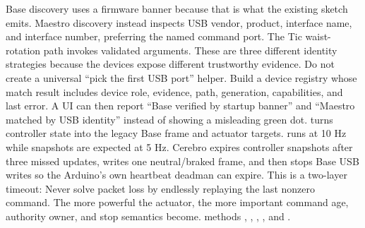 {}
\markdownRendererSectionEnd 
\markdownRendererSectionEnd \markdownRendererSectionBegin
{}\markdownRendererInterblockSeparator
{}Base discovery uses a firmware banner because that is what the existing sketch emits. Maestro discovery instead inspects USB vendor, product, interface name, and interface number, preferring the named command port. The Tic waist-rotation path invokes validated  arguments. These are three different identity strategies because the devices expose different trustworthy evidence.\markdownRendererParagraphSeparator
{}Do not create a universal “pick the first USB port” helper. Build a device registry whose match result includes device role, evidence, path, generation, capabilities, and last error. A UI can then report “Base verified by startup banner” and “Maestro matched by USB identity” instead of showing a misleading green dot.\markdownRendererInterblockSeparator
{}
\markdownRendererSectionEnd \markdownRendererSectionBegin
{}\markdownRendererInterblockSeparator
{} turns controller state into the legacy Base frame and actuator targets.  runs at 10 Hz while snapshots are expected at 5 Hz. Cerebro expires controller snapshots after three missed updates, writes one neutral/braked frame, and then stops Base USB writes so the Arduino's own heartbeat deadman can expire.\markdownRendererParagraphSeparator
{}This is a two-layer timeout:\markdownRendererInterblockSeparator
{}\markdownRendererInterblockSeparator
{}Never solve packet loss by endlessly replaying the last nonzero command. The more powerful the actuator, the more important command age, authority owner, and stop semantics become.\markdownRendererInterblockSeparator
{}
\markdownRendererSectionEnd \markdownRendererSectionBegin
{}\markdownRendererInterblockSeparator
{}\markdownRendererBlockQuoteBegin
{}  methods , , , , and .\markdownRendererBlockQuoteEnd \markdownRendererInterblockSeparator
